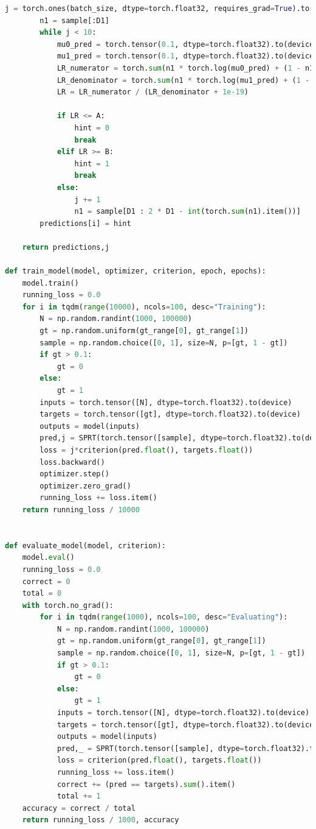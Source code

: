 \documentclass[withoutpreface,bwprint]{cumcmthesis} %
\begin{document}
\begin{appendices}
\begin{lstlisting}[language=python]
        j = torch.ones(batch_size, dtype=torch.float32, requires_grad=True).to(device)
        n1 = sample[:D1]
        while j < 10:
            mu0_pred = torch.tensor(0.1, dtype=torch.float32).to(device) + delta_mu[0]
            mu1_pred = torch.tensor(0.1, dtype=torch.float32).to(device) - delta_mu[1]
            LR_numerator = torch.sum(n1 * torch.log(mu0_pred) + (1 - n1) * torch.log(1 - mu0_pred))
            LR_denominator = torch.sum(n1 * torch.log(mu1_pred) + (1 - n1) * torch.log(1 - mu1_pred))
            LR = LR_numerator / (LR_denominator + 1e-19)

            if LR <= A:
                hint = 0
                break
            elif LR >= B:
                hint = 1
                break
            else:
                j += 1
                n1 = sample[D1 : 2 * D1 - int(torch.sum(n1).item())]
        predictions[i] = hint

    return predictions,j

def train_model(model, optimizer, criterion, epoch, epochs):
    model.train()
    running_loss = 0.0
    for i in tqdm(range(10000), ncols=100, desc="Training"):
        N = np.random.randint(1000, 100000)
        gt = np.random.uniform(gt_range[0], gt_range[1])
        sample = np.random.choice([0, 1], size=N, p=[gt, 1 - gt])
        if gt > 0.1:
            gt = 0
        else:
            gt = 1
        inputs = torch.tensor([N], dtype=torch.float32).to(device)
        targets = torch.tensor([gt], dtype=torch.float32).to(device)
        outputs = model(inputs)
        pred,j = SPRT(torch.tensor([sample], dtype=torch.float32).to(device), outputs)
        loss = j*criterion(pred.float(), targets.float())
        loss.backward()
        optimizer.step()
        optimizer.zero_grad()
        running_loss += loss.item()
    return running_loss / 10000


def evaluate_model(model, criterion):
    model.eval()
    running_loss = 0.0
    correct = 0
    total = 0
    with torch.no_grad():
        for i in tqdm(range(1000), ncols=100, desc="Evaluating"):
            N = np.random.randint(1000, 100000)
            gt = np.random.uniform(gt_range[0], gt_range[1])
            sample = np.random.choice([0, 1], size=N, p=[gt, 1 - gt])
            if gt > 0.1:
                gt = 0
            else:
                gt = 1
            inputs = torch.tensor([N], dtype=torch.float32).to(device)
            targets = torch.tensor([gt], dtype=torch.float32).to(device)
            outputs = model(inputs)
            pred,_ = SPRT(torch.tensor([sample], dtype=torch.float32).to(device), outputs)
            loss = criterion(pred.float(), targets.float())
            running_loss += loss.item()
            correct += (pred == targets).sum().item()
            total += 1
    accuracy = correct / total
    return running_loss / 1000, accuracy



\end{lstlisting}
\end{appendices}
\end{document}
